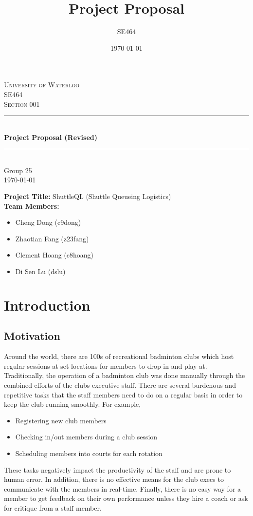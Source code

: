 \documentclass{article}
\title{Project Proposal}
\author{SE464}
\date{\today}
\begin{document}
\begin{titlepage}
\newcommand{\HRule}{\rule{\linewidth}{0.5mm}}

\center

\textsc{\huge University of Waterloo}\\[3cm]
\textsc{\LARGE SE464}\\[1.5cm]
\textsc{\Large Section 001}\\[1.5cm]

\HRule \\[0.75cm]
{ \Huge \bfseries Project Proposal (Revised)}\\[0.5cm]
\HRule \\[2cm]

\Large Group 25 \\  [8cm]

{\Large \today}\\

\vfill
\end{titlepage}

\noindent\textbf{Project Title:} ShuttleQL (Shuttle Queueing Logistics) \\
\textbf{Team Members:}
\begin{itemize}
  \item Cheng Dong (c9dong)
  \item Zhaotian Fang (z23fang)
  \item Clement Hoang (c8hoang)
  \item Di Sen Lu (dslu)
\end{itemize}

\section{Introduction}
\subsection{Motivation}
Around the world, there are 100s of recreational badminton clubs which host
regular sessions at set locations for members to drop in and play at.
Traditionally, the operation of a badminton club was done manually through the
combined efforts of the clubs executive staff. There are several burdenous
and repetitive tasks that the staff members need to do on a regular basis in
order to keep the club running smoothly. For example,
\begin{itemize}
  \item Registering new club members
  \item Checking in/out members during a club session
  \item Scheduling members into courts for each rotation
\end{itemize}
These tasks negatively impact the productivity of the staff and are prone
to human error.
In addition, there is no effective means for the club execs to communicate
with the members in real-time.
Finally, there is no easy way for a member to get feedback on their own performance
unless they hire a coach or ask for critique from a staff member.
\end{document}
